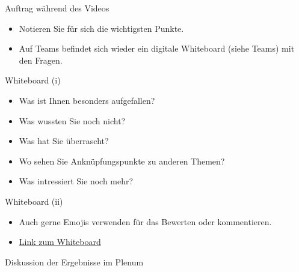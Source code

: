 \begin{frame}{Auftrag während des Videos}
    \begin{itemize}
        \item Notieren Sie für sich die wichtigsten Punkte.
        \item Auf Teams befindet sich wieder ein digitale Whiteboard (siehe Teams) mit den Fragen.
    \end{itemize}
\end{frame}


\begin{frame}{Whiteboard (i)}
    \begin{Fragenblock}
        \begin{itemize}
            \item[\textbullet]  Was ist Ihnen besonders aufgefallen?
            \item[\textbullet]  Was wussten Sie noch nicht?
            \item[\textbullet]  Was hat Sie überrascht?
            \item[\textbullet]  Wo sehen Sie Anknüpfungspunkte zu anderen Themen?
            \item[\textbullet]  Was intressiert Sie noch mehr?
        \end{itemize}
    \end{Fragenblock}

\end{frame}


\begin{frame}{Whiteboard (ii)}

    \begin{itemize}
        \item[\textbullet] Auch gerne Emojis verwenden für das Bewerten oder kommentieren.
        \item[\textbullet] \href{https://schweizerischebau-my.sharepoint.com/:wb:/g/personal/pfaendler_bauschule_ch/EdyoT3CFufxPt8-uCapvAboB959KePV2RNeFZL2vQjeKBA?e=PM8NQJ}{Link zum Whiteboard}
    \end{itemize}

\end{frame}




\begin{frame}{Diskussion der Ergebnisse im Plenum}

\end{frame}

